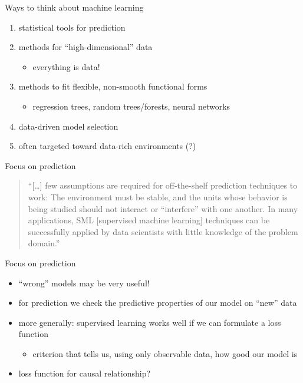 \documentclass[xcolor=dvipsnames, handout]{beamer}
\begin{document}
\begin{frame}{Ways to think about machine learning}
\begin{enumerate}
  \item
  statistical tools for prediction
  \item 
  methods for ``high-dimensional'' data
  \begin{itemize}
    \item everything is data!
  \end{itemize}
  \item 
  methods to fit flexible, non-smooth functional forms 
  \begin{itemize}
    \item regression trees, random trees/forests, neural networks
  \end{itemize}
  \item 
  data-driven model selection
  \item 
  often targeted toward data-rich environments (?)
\end{enumerate}
\end{frame}


\begin{frame}{Focus on prediction}
\begin{quote}
``[\dots] few assumptions are required for off-the-shelf prediction techniques to work: The environment must be stable, and the units whose behavior is being studied should not interact or ``interfere'' with one another. In many applications, SML [supervised machine learning] techniques can be successfully applied by data scientists with little knowledge of the problem domain.'' \parencite{athey2017beyond}
\end{quote}
\end{frame}

\begin{frame}{Focus on prediction}
\begin{itemize}
  \item ``wrong'' models may be very useful!
  \item for prediction we check the predictive properties of our model on ``new'' data
  \item more generally: supervised learning works well if we can formulate a loss function
  \begin{itemize}
    \item criterion that tells us, using only observable data, how good our model is
  \end{itemize}
  \item loss function for causal relationship?
\end{itemize}
\end{frame}
\end{document}
